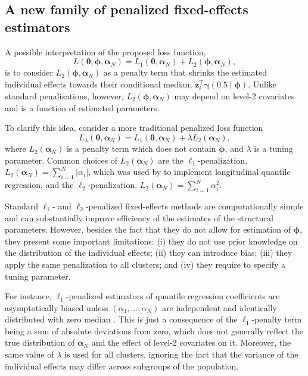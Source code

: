 \documentclass[12pt]{article}
\def\T{{ \mathrm{\scriptscriptstyle T} }}
\def\thetavec{\bm{\theta}}
\def\phivec{\bm{\phi}}
\def\gammavec{\bm{\gamma}}
\def\aa{\bm{\alpha}_N}
\def\zz{\bm{z}}
\begin{document}
\subsection{A new family of penalized fixed-effects estimators}\label{subsec:penalty}

A possible interpretation of the proposed loss function,
\begin{equation}\label{Lbis}\nonumber
L(\thetavec, \phivec, \aa) = L_1(\thetavec, \aa) + L_2(\phivec, \aa),
\end{equation}
is to consider $L_2(\phivec, \aa)$ as a penalty term that shrinks the estimated individual effects
towards their conditional median, $\zz_i^\T\gammavec(0.5 \mid \phivec)$. Unlike standard
penalizations, however, $L_2(\phivec, \aa)$ may depend on level-2 covariates and is a function of estimated parameters.

To clarify this idea, consider a more traditional penalized loss function
\begin{equation}\label{Lp}\nonumber
L_{\lambda}(\thetavec, \aa) = L_1(\thetavec, \aa) + \lambda L_2(\aa),
\end{equation}
where $L_2(\aa)$ is a penalty term which does not contain $\phivec$, and $\lambda$ is a tuning parameter.
Common choices of $L_2(\aa)$ are the $\ell_1$-penalization, $L_2(\aa) = \sum_{i = 1}^N|\alpha_i|$,
which was used by \cite{koenker2004} to implement longitudinal quantile regression,
and the $\ell_2$-penalization, $L_2(\aa) = \sum_{i = 1}^N \alpha_i^2$.

Standard $\ell_1$- and $\ell_2$-penalized fixed-effects methods are computationally simple and can
substantially improve efficiency of the estimates of the structural parameters. However, besides the 
fact that they do not allow for estimation of $\phivec$, they present 
some important limitations: 
(i) they do not use prior knowledge on the distribution of the individual effects; 
(ii) they can introduce bias; 
(iii) they apply the same penalization to all clusters; and 
(iv) they require to specify a tuning parameter.

For instance, $\ell_1$-penalized estimators of quantile regression coefficients are asymptotically biased unless
$(\alpha_1, \ldots, \alpha_N)$ are independent and identically distributed with zero median \citep{lamarche}. This is just
a consequence of the $\ell_1$-penalty term being a sum of absolute deviations from zero,
which does not generally reflect the true distribution of $\aa$ and the effect of level-2 covariates on it. 
Moreover, the same value of $\lambda$ is used for all clusters, ignoring the fact that the variance
of the individual effects may differ across subgroups of the population. 
\end{document}
